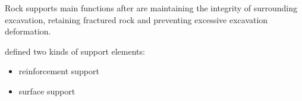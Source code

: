 

Rock supports main functions after \textcite{canada96} are maintaining the integrity of surrounding excavation, retaining fractured rock and preventing excessive excavation deformation.

\textcite{canada96} defined two kinds of support elements:%
\begin{itemize}
\item reinforcement support
\item surface support
\end{itemize}

